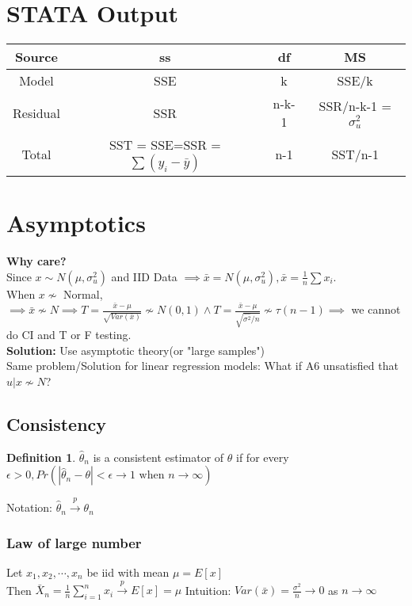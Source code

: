 \documentclass{article}
\theoremstyle{definition}
\newtheorem{definition}{Definition}[section]
\theoremstyle{thrm}
\theoremstyle{lma}
\theoremstyle{ppst}
\theoremstyle{crlr}
\begin{document}
\section{STATA Output}
\begin{tabular}{c|c c c} 
	Source & ss & df & MS\\
	\hline
	Model & SSE &k & SSE/k\\
	Residual & SSR & n-k-1 & SSR/n-k-1 = $\sigma_u^2$\\
	\hline
	Total & SST = SSE=SSR = $\sum(y_i-\bar{y})$ &n-1 & SST/n-1
\end{tabular}

\section{Asymptotics}
\textbf{Why care?}\\
Since $x\sim N(\mu, \sigma_u^2)$ and IID Data $\implies \bar{x} = N(\mu, \sigma_u^2), \bar{x} = \frac{1}{n}\sum x_i$.\\
When $x \not\sim$ Normal, $\implies \bar{x}\not\sim N\implies T = \frac{\bar{x}-\mu}{\sqrt{Var(\bar{x})}}\not\sim N(0,1)\wedge T = \frac{\bar{x}-\mu}{\sqrt{\hat{\sigma^2}/n}}\not\sim \tau(n-1)\implies $ we cannot do CI and T or F testing.\\
\textbf{Solution: } Use asymptotic theory(or "large samples")\\
Same problem/Solution for linear regression models: What if A6 unsatisfied that $u|x \not\sim N$?

\subsection{Consistency}
\begin{definition}
	$ \hat{\theta}_n$ is a consistent estimator of $\theta$ if for every $\epsilon >0, Pr(|\hat{\theta}_n-\theta|<\epsilon \to 1 \text{ when } n\to \infty)$
\end{definition}
Notation: $\hat{\theta}_n \stackrel{p}{\to}\theta_n$

\subsubsection{Law of large number}
Let $x_1,x_2,\cdots, x_n$ be iid with mean $\mu = E[x]$\\
Then $\bar{X}_n = \frac{1}{n}\sum_{i=1}^nx_i \stackrel{p}{\to} E[x]=\mu$
Intuition: $Var(\bar{x}) = \frac{\sigma^2}{n} \to 0$ as $n \to \infty$
\end{document}
